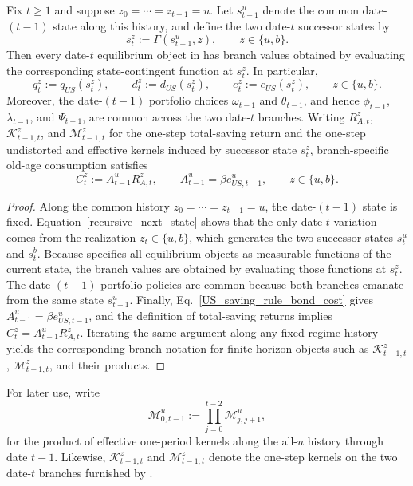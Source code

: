 \documentclass{article}
\begin{document}
\begin{lem}\label{lem_branch_reduction}\label{ass_switch_dependence}
Fix $t\ge 1$ and suppose $z_0=\cdots=z_{t-1}=u$. Let $s_{t-1}^u$ denote the common date-$(t-1)$ state along this history, and define the two date-$t$ successor states by
\[
s_t^z:=\Gamma(s_{t-1}^u,z),
\qquad
z\in\{u,b\}.
\]
Then every date-$t$ equilibrium object in  has branch values obtained by evaluating the corresponding state-contingent function at $s_t^z$. In particular,
\[
q_t^z:=q_{US}(s_t^z),
\qquad
d_t^z:=d_{US}(s_t^z),
\qquad
e_t^z:=e_{US}(s_t^z),
\qquad
z\in\{u,b\}.
\]
Moreover, the date-$(t-1)$ portfolio choices $\omega_{t-1}$ and $\theta_{t-1}$, and hence $\phi_{t-1}$, $\lambda_{t-1}$, and $\Psi_{t-1}$, are common across the two date-$t$ branches. Writing $R_{A,t}^z$, $\mathcal K_{t-1,t}^z$, and $\mathcal M_{t-1,t}^z$ for the one-step total-saving return and the one-step undistorted and effective kernels induced by successor state $s_t^z$, branch-specific old-age consumption satisfies
\[
C_t^z:=A_{t-1}^uR_{A,t}^z,
\qquad
A_{t-1}^u=\beta e_{US,t-1}^u,
\qquad
z\in\{u,b\}.
\]
\end{lem}

\begin{proof}
Along the common history $z_0=\cdots=z_{t-1}=u$, the date-$(t-1)$ state is fixed. Equation~\eqref{recursive_next_state} shows that the only date-$t$ variation comes from the realization $z_t\in\{u,b\}$, which generates the two successor states $s_t^u$ and $s_t^b$. Because  specifies all equilibrium objects as measurable functions of the current state, the branch values are obtained by evaluating those functions at $s_t^z$. The date-$(t-1)$ portfolio policies are common because both branches emanate from the same state $s_{t-1}^u$. Finally, Eq.~\eqref{US_saving_rule_bond_cost} gives $A_{t-1}^u=\beta e_{US,t-1}^u$, and the definition of total-saving returns implies $C_t^z=A_{t-1}^uR_{A,t}^z$. Iterating the same argument along any fixed regime history yields the corresponding branch notation for finite-horizon objects such as $\mathcal K_{t-1,t}^z$, $\mathcal M_{t-1,t}^z$, and their products.
\end{proof}

For later use, write
\[
\mathcal M_{0,t-1}^u:=\prod_{j=0}^{t-2}\mathcal M_{j,j+1}^u,
\]
for the product of effective one-period kernels along the all-$u$ history through date $t-1$. Likewise, $\mathcal K_{t-1,t}^z$ and $\mathcal M_{t-1,t}^z$ denote the one-step kernels on the two date-$t$ branches furnished by .
\end{document}
